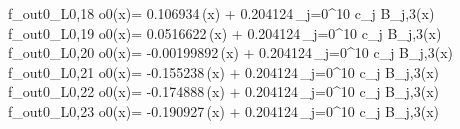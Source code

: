 f_{out0_L0,18	o0}(x)= 0.106934\,\phi(x) + 0.204124\,\sum_{j=0}^{10} c_j B_{j,3}(x)
f_{out0_L0,19	o0}(x)= 0.0516622\,\phi(x) + 0.204124\,\sum_{j=0}^{10} c_j B_{j,3}(x)
f_{out0_L0,20	o0}(x)= -0.00199892\,\phi(x) + 0.204124\,\sum_{j=0}^{10} c_j B_{j,3}(x)
f_{out0_L0,21	o0}(x)= -0.155238\,\phi(x) + 0.204124\,\sum_{j=0}^{10} c_j B_{j,3}(x)
f_{out0_L0,22	o0}(x)= -0.174888\,\phi(x) + 0.204124\,\sum_{j=0}^{10} c_j B_{j,3}(x)
f_{out0_L0,23	o0}(x)= -0.190927\,\phi(x) + 0.204124\,\sum_{j=0}^{10} c_j B_{j,3}(x)
\\
